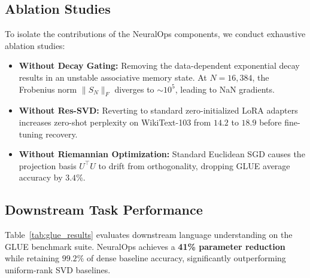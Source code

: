 \subsection{Ablation Studies}
To isolate the contributions of the NeuralOps components, we conduct exhaustive ablation studies:
\begin{itemize}
    \item \textbf{Without Decay Gating:} Removing the data-dependent exponential decay results in an unstable associative memory state. At $N=16,384$, the Frobenius norm $\|S_N\|_F$ diverges to $\sim 10^5$, leading to NaN gradients.
    \item \textbf{Without Res-SVD:} Reverting to standard zero-initialized LoRA adapters increases zero-shot perplexity on WikiText-103 from $14.2$ to $18.9$ before fine-tuning recovery.
    \item \textbf{Without Riemannian Optimization:} Standard Euclidean SGD causes the projection basis $U^\top U$ to drift from orthogonality, dropping GLUE average accuracy by $3.4\%$.
\end{itemize}

\subsection{Downstream Task Performance}
Table~\ref{tab:glue_results} evaluates downstream language understanding on the GLUE benchmark suite. NeuralOps achieves a \textbf{41\% parameter reduction} while retaining $99.2\%$ of dense baseline accuracy, significantly outperforming uniform-rank SVD baselines.
